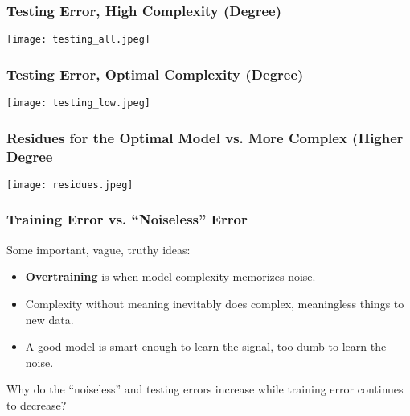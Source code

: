 \documentclass[presentation]{beamer}
\begin{document}
\begin{frame}
\frametitle{Testing Error, High Complexity (Degree)}

\texttt{[image: testing\_all.jpeg]}

\end{frame}

\begin{frame}
\frametitle{Testing Error, Optimal Complexity (Degree)}

\texttt{[image: testing\_low.jpeg]}

\end{frame}

\begin{frame}
\frametitle{Residues for the Optimal Model vs. More Complex (Higher Degree}

\texttt{[image: residues.jpeg]}

\end{frame}

\begin{frame}
\frametitle{Training Error vs. ``Noiseless'' Error}

Some important, vague, truthy ideas:

\begin{itemize}

\item \textbf{Overtraining} is when model complexity memorizes noise.
\item Complexity without meaning inevitably does complex, meaningless things to new data.
\item A good model is smart enough to learn the signal, too dumb to learn the noise.

\end{itemize}

Why do the ``noiseless'' and testing errors increase while training error continues to decrease?

\end{frame}

\end{document}
